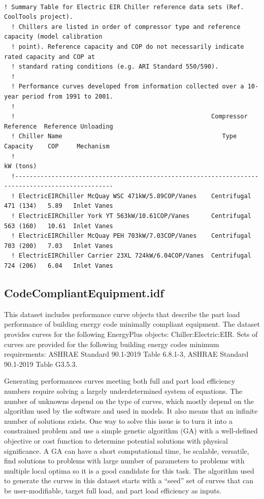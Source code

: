 \begin{lstlisting}

! Summary Table for Electric EIR Chiller reference data sets (Ref. CoolTools project).
  ! Chillers are listed in order of compressor type and reference capacity (model calibration
  ! point). Reference capacity and COP do not necessarily indicate rated capacity and COP at
  ! standard rating conditions (e.g. ARI Standard 550/590).
  !
  ! Performance curves developed from information collected over a 10-year period from 1991 to 2001.
  !
  !                                                      Compressor   Reference  Reference Unloading
  ! Chiller Name                                            Type       Capacity    COP     Mechanism
  !                                                                    kW (tons)
  !-------------------------------------------------------------------------------------------------
  ! ElectricEIRChiller McQuay WSC 471kW/5.89COP/Vanes    Centrifugal   471 (134)   5.89   Inlet Vanes
  ! ElectricEIRChiller York YT 563kW/10.61COP/Vanes      Centrifugal   563 (160)   10.61  Inlet Vanes
  ! ElectricEIRChiller McQuay PEH 703kW/7.03COP/Vanes    Centrifugal   703 (200)   7.03   Inlet Vanes
  ! ElectricEIRChiller Carrier 23XL 724kW/6.04COP/Vanes  Centrifugal   724 (206)   6.04   Inlet Vanes
\end{lstlisting}

\subsection{CodeCompliantEquipment.idf}\label{codecompliantequipment.idf}

This dataset includes performance curve objects that describe the part load performance of building energy code minimally compliant equipment. The dataset provides curves for the following EnergyPlus objects: Chiller:Electric:EIR. Sets of curves are provided for the following building energy codes minimum requirements: ASHRAE Standard 90.1-2019 Table 6.8.1-3, ASHRAE Standard 90.1-2019 Table G3.5.3.

Generating performances curves meeting both full and part load efficiency numbers require solving a largely underdetermined system of equations. The number of unknowns depend on the type of curves, which mostly depend on the algorithm used by the software and used in models. It also means that an infinite number of solutions exists. One way to solve this issue is to turn it into a constrained problem and use a simple genetic algorithm (GA) with a well-defined objective or cost function to determine potential solutions with physical significance. A GA can have a short computational time, be scalable, versatile, find solutions to problems with large number of parameters to problems with multiple local optima so it is a good candidate for this task. The algorithm used to generate the curves in this dataset starts with a “seed” set of curves that can be user-modifiable, target full load, and part load efficiency as inputs.

